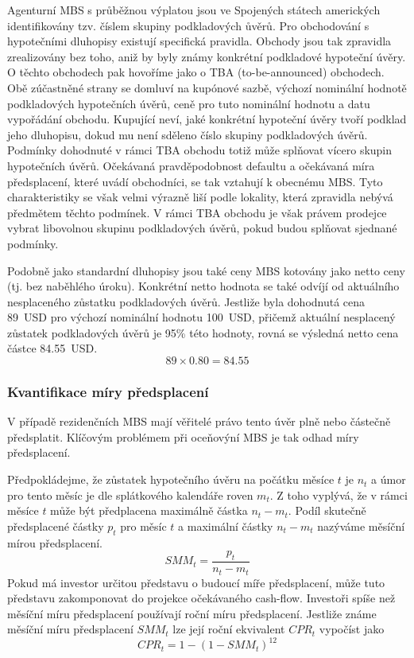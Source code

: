 \documentclass[a4paper]{book}
\begin{document}
Agenturní MBS s průběžnou výplatou jsou ve Spojených státech amerických identifikovány tzv. číslem skupiny podkladových ůvěrů. Pro obchodování s hypotečními dluhopisy existují specifická pravidla. Obchody jsou tak zpravidla zrealizovány bez toho, aniž by byly známy konkrétní podkladové hypoteční úvěry. O těchto obchodech pak hovoříme jako o TBA (to-be-announced) obchodech. Obě zúčastněné strany se domluví na kupónové sazbě, výchozí nominální hodnotě podkladových hypotečních úvěrů, ceně pro tuto nominální hodnotu a datu vypořádání obchodu. Kupující neví, jaké konkrétní hypoteční úvěry tvoří podklad jeho dluhopisu, dokud mu není sděleno číslo skupiny podkladových úvěrů. Podmínky dohodnuté v rámci TBA obchodu totiž může splňovat vícero skupin hypotečních úvěrů.  Očekávaná pravděpodobnost defaultu a očekávaná míra předsplacení, které uvádí obchodníci, se tak vztahují k obecnému MBS. Tyto charakteristiky se však velmi výrazně liší podle lokality, která zpravidla nebývá předmětem těchto podmínek. V rámci TBA obchodu je však právem prodejce vybrat libovolnou skupinu podkladových úvěrů, pokud budou splňovat sjednané podmínky.

Podobně jako standardní dluhopisy jsou také ceny MBS kotovány jako netto ceny (tj. bez naběhlého úroku). Konkrétní netto hodnota se také odvíjí od aktuálního nesplaceného zůstatku podkladových úvěrů. Jestliže byla dohodnutá cena 89~USD pro výchozí nominální hodnotu 100~USD, přičemž aktuální nesplacený zůstatek podkladových úvěrů je 95\% této hodnoty, rovná se výsledná netto cena částce 84.55~USD.
\begin{equation*}
89 \times 0.80 = 84.55
\end{equation*}

\subsubsection{Kvantifikace míry předsplacení}

V případě rezidenčních MBS mají věřitelé právo tento úvěr plně nebo částečně předsplatit. Klíčovým problémem při oceňovýní MBS je tak odhad míry předsplacení.

Předpokládejme, že zůstatek hypotečního úvěru na počátku měsíce $t$ je $n_t$ a úmor pro tento měsíc je dle splátkového kalendáře roven $m_t$. Z toho vyplývá, že v rámci měsíce $t$ může být předplacena maximálně částka $n_t - m_t$. Podíl skutečně předsplacené částky $p_t$ pro měsíc $t$ a maximální částky $n_t - m_t$ nazýváme měsíční mírou předsplacení.
\begin{equation*}
SMM_t = \frac{p_t}{n_t - m_t}
\end{equation*}
Pokud má investor určitou představu o budoucí míře předsplacení, může tuto představu zakomponovat do projekce očekávaného cash-flow. Investoři spíše než měsíční míru předsplacení používají roční míru předsplacení. Jestliže známe měsíční míru předsplacení $SMM_t$ lze její roční ekvivalent $CPR_t$ vypočíst jako
\begin{equation*}
CPR_t = 1 - (1 - SMM_t)^{12}
\end{equation*}
\end{document}
